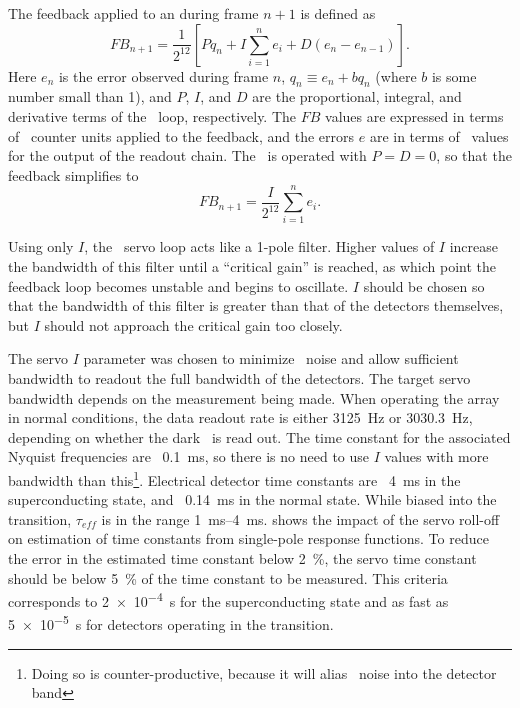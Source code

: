 The feedback applied to an  during frame $n+1$ is defined as \cite{mce_team_data_2013}
\begin{equation}
  FB_{n+1} = \frac{1}{2^{12}} \left[P q_n + I \sum_{i=1}^n e_i + D (e_n - e_{n-1}) \right].
\end{equation}
Here $e_n$ is the error observed during frame $n$, $q_n \equiv e_n + b q_n$ (where $b$ is some number small than 1), and $P$, $I$, and $D$ are the proportional, integral, and derivative terms of the \PID\ loop, respectively.
The $FB$ values are expressed in terms of \DAC\ counter units applied to the  feedback, and the errors $e$ are in terms of \ADC\ values for the output of the readout chain.
The \Imager\ is operated with $P = D = 0$, so that the feedback simplifies to
\begin{equation} \label{eqn:mce-pid-i-only}
  FB_{n+1} = \frac{I}{2^{12}} \sum_{i=1}^n e_i.
\end{equation}

Using only $I$, the \MCE\ servo loop acts like a 1-pole filter.
Higher values of $I$ increase the bandwidth of this filter until a ``critical gain'' is reached, as which point the feedback loop becomes unstable and begins to oscillate.
$I$ should be chosen so that the bandwidth of this filter is greater than that of the detectors themselves, but $I$ should not approach the critical gain too closely.

The servo $I$ parameter was chosen to minimize \SQUID\ noise and allow sufficient bandwidth to readout the full bandwidth of the detectors.
The target servo bandwidth depends on the measurement being made.
When operating the array in normal conditions, the data readout rate is either \SI{3125}{Hz} or \SI{3030.3}{Hz}, depending on whether the dark \SQUID\ is read out.
The time constant for the associated Nyquist frequencies are \abt~\SI{0.1}{ms}, so there is no need to use $I$ values with more bandwidth than this\footnote{Doing so is counter-productive, because it will alias \SQUID\ noise into the detector band}.
Electrical detector time constants are \abt~\SI{4}{ms} in the superconducting state, and \abt~\SI{0.14}{ms} in the normal state.
While biased into the transition, $\tau_{eff}$ is in the range \SIrange{1}{4}{ms}.
 shows the impact of the servo roll-off on estimation of time constants from single-pole response functions.
To reduce the error in the estimated time constant below \SI{2}{\percent}, the servo time constant should be below \SI{5}{\percent} of the time constant to be measured.
This criteria corresponds to \SI{2e-4}{s} for the superconducting state and as fast as \SI{5e-5}{s} for detectors operating in the transition.

